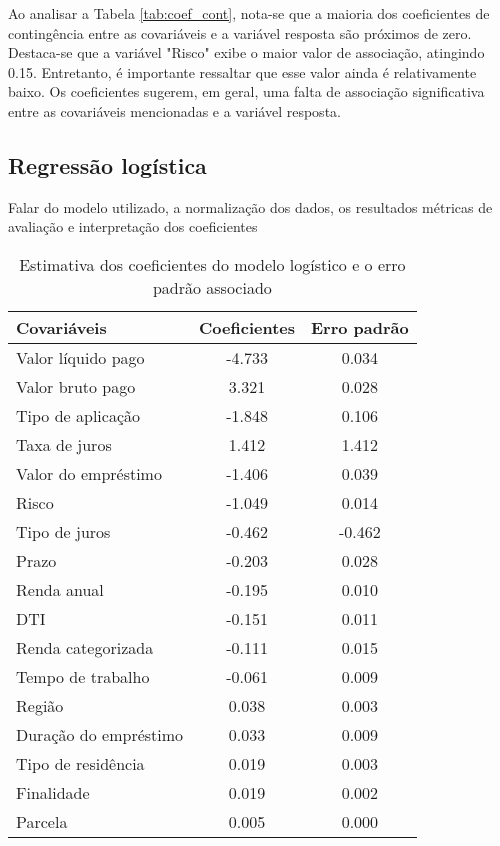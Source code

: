 Ao analisar a Tabela \ref{tab:coef_cont}, nota-se que a maioria dos coeficientes de contingência entre as 
covariáveis e a variável resposta são próximos de zero. Destaca-se que a variável "Risco"
exibe o maior valor de associação, atingindo 0.15. Entretanto, é importante ressaltar que esse valor
ainda é relativamente baixo. Os coeficientes sugerem, em geral, uma falta de associação significativa 
entre as covariáveis mencionadas e a variável resposta.


\subsection{Regressão logística}

Falar do modelo utilizado, a normalização dos dados, os resultados
métricas de avaliação e interpretação dos coeficientes


\begin{table}[H]
\centering
\begin{tabular}{lcc}
  \toprule
    \textbf{Covariáveis} & \textbf{Coeficientes} &  \textbf{Erro padrão} \\
  \midrule
        Valor líquido pago & -4.733 &  0.034 \\
        Valor bruto pago &  3.321 &  0.028 \\
        Tipo de aplicação & -1.848 &  0.106 \\
        Taxa de juros &  1.412 &  1.412 \\
        Valor do empréstimo & -1.406 &  0.039 \\
        Risco & -1.049 &  0.014 \\
        Tipo de juros & -0.462 &  -0.462  \\
        Prazo & -0.203 &  0.028 \\
        Renda anual & -0.195 &  0.010 \\
        DTI & -0.151 &  0.011 \\
        Renda categorizada & -0.111 &  0.015 \\
        Tempo de trabalho & -0.061 &  0.009 \\
        Região &  0.038 &  0.003\\
        Duração do empréstimo &  0.033 &  0.009 \\
        Tipo de residência &  0.019 &  0.003 \\
        Finalidade &  0.019 &  0.002  \\
        Parcela &  0.005 &  0.000  \\
  \bottomrule
\end{tabular}
\caption{Estimativa dos coeficientes do modelo logístico e o erro padrão associado}
\label{tab:result_model_logist}
\end{table}

